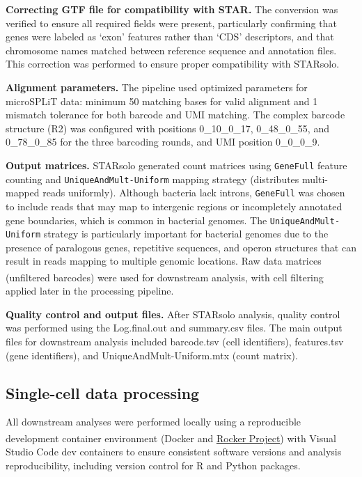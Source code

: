 \documentclass[
  11pt,
  a4paper,
]{report}
\begin{document}
\textbf{Correcting GTF file for compatibility with STAR.} The conversion
was verified to ensure all required fields were present, particularly
confirming that genes were labeled as `exon' features rather than `CDS'
descriptors, and that chromosome names matched between reference
sequence and annotation files. This correction was performed to ensure
proper compatibility with STARsolo.

\textbf{Alignment parameters.} The pipeline used optimized parameters
for microSPLiT data: minimum 50 matching bases for valid alignment and 1
mismatch tolerance for both barcode and UMI matching. The complex
barcode structure (R2) was configured with positions 0\_10\_0\_17,
0\_48\_0\_55, and 0\_78\_0\_85 for the three barcoding rounds, and UMI
position 0\_0\_0\_9.

\textbf{Output matrices.} STARsolo generated count matrices using
\texttt{GeneFull} feature counting and \texttt{UniqueAndMult-Uniform}
mapping strategy (distributes multi-mapped reads uniformly). Although
bacteria lack introns, \texttt{GeneFull} was chosen to include reads
that may map to intergenic regions or incompletely annotated gene
boundaries, which is common in bacterial genomes. The
\texttt{UniqueAndMult-Uniform} strategy is particularly important for
bacterial genomes due to the presence of paralogous genes, repetitive
sequences, and operon structures that can result in reads mapping to
multiple genomic locations. Raw data matrices (unfiltered barcodes) were
used for downstream
analysis\textsuperscript{}, with cell
filtering applied later in the processing pipeline.

\textbf{Quality control and output files.} After STARsolo analysis,
quality control was performed using the Log.final.out and summary.csv
files. The main output files for downstream analysis included
barcode.tsv (cell identifiers), features.tsv (gene identifiers), and
UniqueAndMult-Uniform.mtx (count matrix).

\subsection{Single-cell data
processing}\label{single-cell-data-processing}

All downstream analyses were performed locally using a reproducible
development container environment
(Docker\textsuperscript{} and
\href{https://rocker-project.org/images/devcontainer/features.html}{Rocker
Project}) with Visual Studio Code dev containers to ensure consistent
software versions and analysis reproducibility, including version
control for R and Python packages.
\end{document}
